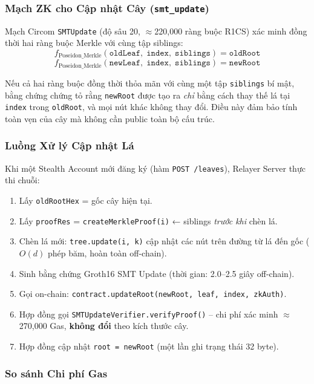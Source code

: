 \documentclass[../DoAn.tex]{subfiles}
\begin{document}
\subsubsection{Mạch ZK cho Cập nhật Cây (\texttt{smt\_update})}

Mạch Circom \texttt{SMTUpdate} (độ sâu 20, $\approx$220,000 ràng buộc R1CS) xác minh đồng thời hai ràng buộc Merkle với cùng tập siblings:
\[
    f_{\text{Poseidon\_Merkle}}\!\left(\texttt{oldLeaf},\; \texttt{index},\; \texttt{siblings}\right) = \texttt{oldRoot}
\]
\[
    f_{\text{Poseidon\_Merkle}}\!\left(\texttt{newLeaf},\; \texttt{index},\; \texttt{siblings}\right) = \texttt{newRoot}
\]

Nếu cả hai ràng buộc đồng thời thỏa mãn với cùng một tập \texttt{siblings} bí mật, bằng chứng chứng tỏ rằng \texttt{newRoot} được tạo ra \textit{chỉ} bằng cách thay thế lá tại \texttt{index} trong \texttt{oldRoot}, và mọi nút khác không thay đổi. Điều này đảm bảo tính toàn vẹn của cây mà không cần public toàn bộ cấu trúc.

\subsubsection{Luồng Xử lý Cập nhật Lá}

Khi một Stealth Account mới đăng ký (hàm \texttt{POST /leaves}), Relayer Server thực thi chuỗi:

\begin{enumerate}
    \item Lấy \texttt{oldRootHex} = gốc cây hiện tại.
    \item Lấy \texttt{proofRes} = \texttt{createMerkleProof(i)} ← siblings \textit{trước khi} chèn lá.
    \item Chèn lá mới: \texttt{tree.update(i, k)} cập nhật các nút trên đường từ lá đến gốc ($O(d)$ phép băm, hoàn toàn off-chain).
    \item Sinh bằng chứng Groth16 SMT Update (thời gian: 2.0--2.5 giây off-chain).
    \item Gọi on-chain: \texttt{contract.updateRoot(newRoot, leaf, index, zkAuth)}.
    \item Hợp đồng gọi \texttt{SMTUpdateVerifier.verifyProof()} -- chi phí xác minh $\approx$270,000 Gas, \textbf{không đổi} theo kích thước cây.
    \item Hợp đồng cập nhật \texttt{root = newRoot} (một lần ghi trạng thái 32 byte).
\end{enumerate}

\subsubsection{So sánh Chi phí Gas}
\end{document}
